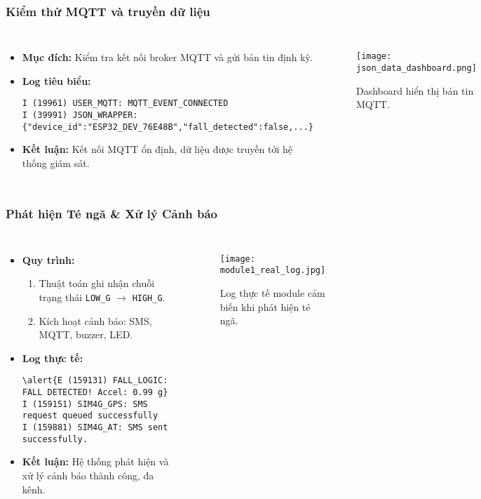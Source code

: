 \begin{frame}[t,fragile]
\frametitle{Kiểm thử MQTT và truyền dữ liệu}
\begin{columns}[T]
    \begin{itemize}
        \item \textbf{Mục đích:} Kiểm tra kết nối broker MQTT và gửi bản tin định kỳ.
        \item \textbf{Log tiêu biểu:}
        \begin{verbatim}
I (19961) USER_MQTT: MQTT_EVENT_CONNECTED
I (39991) JSON_WRAPPER: {"device_id":"ESP32_DEV_76E48B","fall_detected":false,...}
        \end{verbatim}
        \item \textbf{Kết luận:} Kết nối MQTT ổn định, dữ liệu được truyền tới hệ thống giám sát.
    \end{itemize}
    \begin{figure}
        \centering
        \texttt{[image: json\_data\_dashboard.png]}
        \caption{Dashboard hiển thị bản tin MQTT.}
    \end{figure}
\end{columns}
\end{frame}

\begin{frame}[t,fragile]
\frametitle{Phát hiện Té ngã \& Xử lý Cảnh báo}
\begin{columns}[T]
    \begin{itemize}
        \item \textbf{Quy trình:}
        \begin{enumerate}
            \item Thuật toán ghi nhận chuỗi trạng thái \texttt{LOW\_G} $\to$ \texttt{HIGH\_G}.
            \item Kích hoạt cảnh báo: SMS, MQTT, buzzer, LED.
        \end{enumerate}
        \item \textbf{Log thực tế:}
        \begin{verbatim}
\alert{E (159131) FALL_LOGIC: FALL DETECTED! Accel: 0.99 g}
I (159151) SIM4G_GPS: SMS request queued successfully
I (159881) SIM4G_AT: SMS sent successfully.
        \end{verbatim}
        \item \textbf{Kết luận:} Hệ thống phát hiện và xử lý cảnh báo thành công, đa kênh.
    \end{itemize}
    \begin{figure}
        \centering
        \texttt{[image: module1\_real\_log.jpg]}
        \caption{Log thực tế module cảm biến khi phát hiện té ngã.}
    \end{figure}
\end{columns}
\end{frame}

